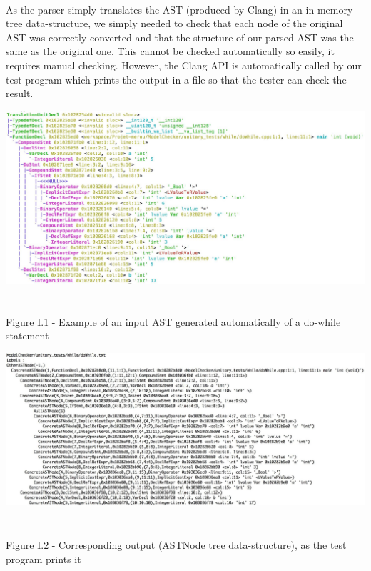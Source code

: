 \documentclass{report}
\begin{document}
\paragraph{}
\hspace{4mm}As the parser simply translates the AST (produced by Clang) in an in-memory tree data-structure, we simply needed to check that
each node of the original AST was correctly converted and that the structure of our parsed AST was the same as the original one.
This cannot be checked automatically so easily, it requires manual checking. However, the Clang API is automatically called by our test
program which prints the output in a file so that the tester can check the result.

\begin{center}
\includegraphics[scale=0.26]{data/dowhile_clang.jpg}
~\\~\\Figure I.1 - Example of an input AST generated automatically of a do-while statement
\end{center}

\begin{center}
\includegraphics[scale=0.26]{data/while_astNode.jpg}
~\\~\\Figure I.2 - Corresponding output (ASTNode tree data-structure), as the test program prints it
\end{center}
\end{document}
